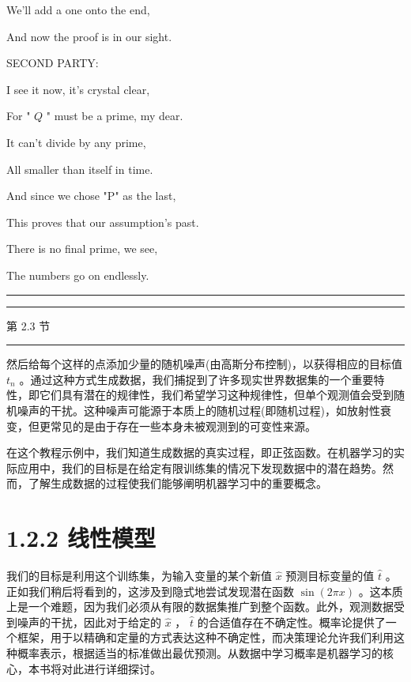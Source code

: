 \documentclass[10pt]{report}
\newcommand{\HRule}{\begin{center}\rule{0.9\linewidth}{0.2mm}\end{center}}
\begin{document}
\hspace*{1em} We'll add a one onto the end,

\hspace*{1em} And now the proof is in our sight.

\hspace*{1em} SECOND PARTY:

\hspace*{1em} I see it now, it's crystal clear,

\hspace*{1em} For " \(Q\) " must be a prime, my dear.

\hspace*{1em} It can't divide by any prime,

\hspace*{1em} All smaller than itself in time.

\hspace*{1em} And since we chose "P" as the last,

\hspace*{1em} This proves that our assumption's past.

\hspace*{1em} There is no final prime, we see,

\hspace*{1em} The numbers go on endlessly.

\HRule

\HRule

第 2.3 节

\HRule

然后给每个这样的点添加少量的随机噪声(由高斯分布控制)，以获得相应的目标值 \({t}_{n}\) 。通过这种方式生成数据，我们捕捉到了许多现实世界数据集的一个重要特性，即它们具有潜在的规律性，我们希望学习这种规律性，但单个观测值会受到随机噪声的干扰。这种噪声可能源于本质上的随机过程(即随机过程)，如放射性衰变，但更常见的是由于存在一些本身未被观测到的可变性来源。

在这个教程示例中，我们知道生成数据的真实过程，即正弦函数。在机器学习的实际应用中，我们的目标是在给定有限训练集的情况下发现数据中的潜在趋势。然而，了解生成数据的过程使我们能够阐明机器学习中的重要概念。

\section*{1.2.2 线性模型}

我们的目标是利用这个训练集，为输入变量的某个新值 \(\widehat{x}\) 预测目标变量的值 \(\widehat{t}\) 。正如我们稍后将看到的，这涉及到隐式地尝试发现潜在函数 \(\sin \left( {2\pi x}\right)\) 。这本质上是一个难题，因为我们必须从有限的数据集推广到整个函数。此外，观测数据受到噪声的干扰，因此对于给定的 \(\widehat{x}\) ， \(\widehat{t}\) 的合适值存在不确定性。概率论提供了一个框架，用于以精确和定量的方式表达这种不确定性，而决策理论允许我们利用这种概率表示，根据适当的标准做出最优预测。从数据中学习概率是机器学习的核心，本书将对此进行详细探讨。
\end{document}
